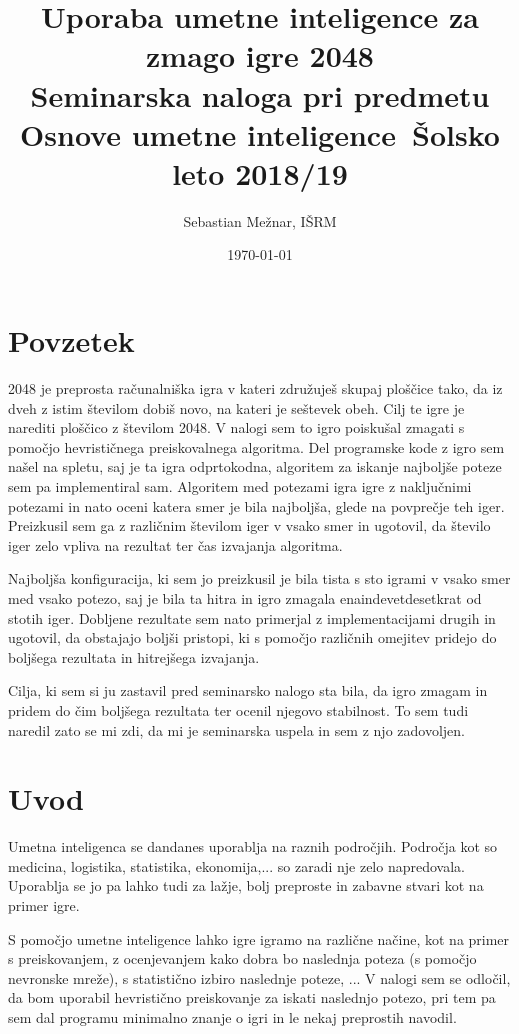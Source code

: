 \documentclass[a4paper,11pt]{article}
\author{Sebastian Mežnar, IŠRM}
\title{
Uporaba umetne inteligence za zmago igre 2048\\
\large Seminarska naloga pri predmetu Osnove umetne inteligence\
\large Šolsko leto 2018/19
}
\date{\today}
\begin{document}
\maketitle

 \section{Povzetek} 
2048 je preprosta računalniška igra v kateri združuješ skupaj ploščice tako, da iz dveh z istim številom dobiš novo, na kateri je seštevek obeh. Cilj te igre je narediti ploščico z številom 2048. V nalogi sem to igro poiskušal zmagati s pomočjo hevrističnega preiskovalnega algoritma. Del programske kode z igro sem našel na spletu, saj je ta igra odprtokodna, algoritem za iskanje najboljše poteze sem pa implementiral sam. Algoritem med potezami igra igre z naključnimi potezami in nato oceni katera smer je bila najboljša, glede na povprečje teh iger. Preizkusil sem ga z različnim številom iger v vsako smer in ugotovil, da število iger zelo vpliva na rezultat ter čas izvajanja algoritma.

 Najboljša konfiguracija, ki sem jo preizkusil je bila tista s sto igrami v vsako smer med vsako potezo, saj je bila ta hitra in igro zmagala enaindevetdesetkrat od stotih iger. Dobljene rezultate sem nato primerjal z implementacijami drugih in ugotovil, da obstajajo boljši pristopi, ki s pomočjo različnih omejitev pridejo do boljšega rezultata in hitrejšega izvajanja. 
 
 Cilja, ki sem si ju zastavil pred seminarsko nalogo sta bila, da igro zmagam in pridem do čim boljšega rezultata ter ocenil njegovo stabilnost. To sem tudi naredil zato se mi zdi, da mi je seminarska uspela in sem z njo zadovoljen.
 
\section{Uvod}
Umetna inteligenca se dandanes uporablja na raznih področjih. Področja kot so medicina, logistika, statistika, ekonomija,... so zaradi nje zelo napredovala. Uporablja se jo pa lahko tudi za lažje, bolj preproste in zabavne stvari kot na primer igre.

S pomočjo umetne inteligence lahko igre igramo na različne načine, kot na primer s preiskovanjem, z ocenjevanjem kako dobra bo naslednja poteza (s pomočjo nevronske mreže), s statistično izbiro naslednje poteze, ... V nalogi sem se odločil, da bom uporabil hevristično preiskovanje za iskati naslednjo potezo, pri tem pa sem dal programu minimalno znanje o igri in le nekaj preprostih navodil.
\end{document}
